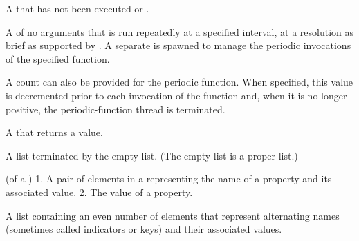 \begin{glossary-list}
%
%
%
%
%
A  that has not been executed or .


%
%

A  of no arguments that is run repeatedly at a specified
interval, at a resolution as brief as supported by . A separate
 is spawned to manage the periodic invocations of the specified
function.

A count can also be provided for the periodic function. When specified, this
value is decremented prior to each invocation of the function and, when it is
no longer positive, the periodic-function thread is terminated.


%
%
%
A  that returns a  value.


%
%
A list terminated by the empty list. (The empty list is a proper list.)


\glent[property]
%
(of a ) 1. A pair of elements in a 
representing the name of a property and its associated value. 2. The value of
a property.


%
%
A list containing an even number of elements that represent alternating names
(sometimes called indicators or keys) and their associated values.




\end{glossary-list}
